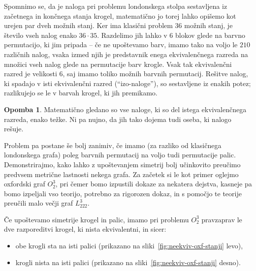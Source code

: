 \documentclass[12pt,a4paper]{amsart}
\theoremstyle{definition} %
\newtheorem{opomba}[definicija]{Opomba}
\theoremstyle{plain} %
\begin{document}
Spomnimo se, da je naloga pri problemu londonskega stolpa sestavljena iz začetnega in končnega stanja krogel, matematično jo torej lahko opišemo kot urejen par dveh možnih stanj. Ker ima klasični problem 36 možnih stanj, je število vseh nalog enako $36 \cdot 35$. Razdelimo jih lahko v $6$ blokov glede na barvno permutacijo, ki jim pripada -- če ne upoštevamo barv, imamo tako na voljo le $210$ različnih nalog, vsaka izmed njih je predstavnik enega ekvivalenčnega razreda na množici vseh nalog glede na permutacije barv krogle. Vsak tak ekvivalenčni razred je velikosti $6$, saj imamo toliko možnih barvnih permutacij. Rešitve nalog, ki spadajo v isti ekvivalenčni razred (``izo-naloge''), so sestavljene iz enakih potez;  razlikujejo se le v barvah krogel, ki jih premikamo. \cite[str.\ 591]{bib:tolspatial}

\begin{opomba}
    Matematično gledano so vse naloge, ki so del istega ekvivalenčnega razreda, enako težke. Ni pa nujno, da jih tako dojema tudi oseba, ki nalogo rešuje.
\end{opomba}

Problem pa postane še bolj zanimiv, če imamo (za razliko od klasičnega londonskega grafa) poleg barvnih permutacij na voljo tudi permutacije palic. Demonstrirajmo, kako lahko z upoštevanjem simetrij bolj učinkovito preučimo predvsem metrične lastnosti nekega grafa. Za začetek si le kot primer oglejmo oxfordski graf $O_2^3$, pri čemer bomo izpustili dokaze za nekatera dejstva, kasneje pa bomo izpeljali vso teorijo, potrebno za rigorozen dokaz, in s pomočjo te teorije preučili malo večji graf $L^3_{222}$. 

Če upoštevamo simetrije krogel in palic, imamo pri problemu $O_2^3$ pravzaprav le dve razporeditvi krogel, ki nista ekvivalentni, in sicer: 
\begin{itemize}
    \item obe krogli sta na isti palici (prikazano na sliki~\ref{fig:neekviv-oxf-stanji} levo),
    \item krogli nista na isti palici (prikazano na sliki~\ref{fig:neekviv-oxf-stanji} desno).
\end{itemize}
\end{document}
